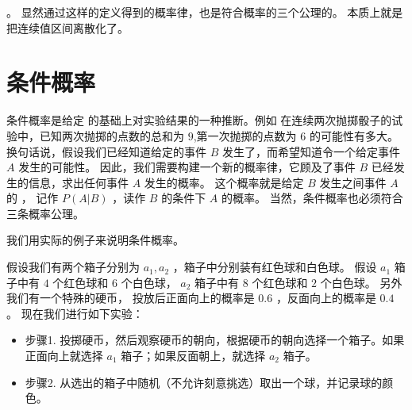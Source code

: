 \documentclass[letterpaper,10pt,english]{sphinxmanual}
\begin{document}
。
显然通过这样的定义得到的概率律，也是符合概率的三个公理的。
本质上就是把连续值区间离散化了。


\section{条件概率}
\label{\detokenize{_u6982_u7387_u57fa_u7840/content:id6}}
条件概率是给定  的基础上对实验结果的一种推断。例如
在连续两次抛掷骰子的试验中，已知两次抛掷的点数的总和为 \(9\),第一次抛掷的点数为 \(6\) 的可能性有多大。
换句话说，假设我们已经知道给定的事件 \(B\) 发生了，而希望知道令一个给定事件 \(A\) 发生的可能性。
因此，我们需要构建一个新的概率律，它顾及了事件 \(B\) 已经发生的信息，求出任何事件 \(A\) 发生的概率。
这个概率就是给定 \(B\) 发生之间事件 \(A\) 的  ，
记作 \(P(A|B)\) ，读作 \(B\) 的条件下 \(A\) 的概率。
当然，条件概率也必须符合三条概率公理。

我们用实际的例子来说明条件概率。

\begin{sphinxShadowBox}

假设我们有两个箱子分别为 \(a_1,a_2\) ，箱子中分别装有红色球和白色球。
假设 \(a_1\) 箱子中有 \(4\) 个红色球和 \(6\) 个白色球，
\(a_2\) 箱子中有 \(8\) 个红色球和 \(2\) 个白色球。 另外我们有一个特殊的硬币，
投放后正面向上的概率是 \(0.6\) ，反面向上的概率是 \(0.4\) 。
现在我们进行如下实验：
\begin{itemize}
\item {} 
步骤1. 投掷硬币，然后观察硬币的朝向，根据硬币的朝向选择一个箱子。如果正面向上就选择 \(a_1\) 箱子；如果反面朝上，就选择 \(a_2\) 箱子。

\item {} 
步骤2. 从选出的箱子中随机（不允许刻意挑选）取出一个球，并记录球的颜色。

\end{itemize}
\end{sphinxShadowBox}
\end{document}
